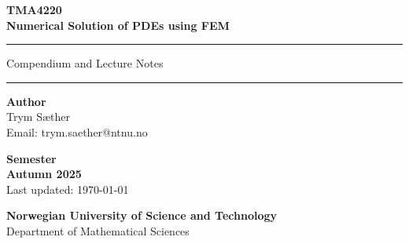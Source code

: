 

\begin{titlepage}
    \newcommand{\HRule}{\rule{\linewidth}{1pt}}
    \centering

    \vfill

    {\color{ntnu-blue}\sffamily\bfseries\LARGE TMA4220}\\[0.3cm]
    {\sffamily\bfseries\fontsize{28}{32}\selectfont Numerical Solution of PDEs using FEM}\\[0.5cm]

    \vfill

    {\color{ntnu-lightblue}\HRule}

    \vspace{0.6cm}

    {\color{ntnu-blue}\sffamily\huge Compendium and Lecture Notes}

    \vspace{0.4cm}

    {\color{ntnu-lightblue}\HRule}

    \vfill

    \begin{minipage}[tb]{0.45\textwidth}
        \raggedright
        {\color{ntnu-blue}\sffamily\large\textbf{Author}}\\[0.2cm]
        {\sffamily\large Trym Sæther}\\[0.2cm]

        {\sffamily\large Email: trym.saether@ntnu.no}\\[0.2cm]
    \end{minipage}
    \hfill
    \begin{minipage}[tb]{0.45\textwidth}
        \raggedleft
        {\color{ntnu-blue}\sffamily\large\textbf{Semester}}\\[0.2cm]
        {\bfseries\sffamily\large Autumn 2025}\\[0.2cm]
        {\sffamily\large Last updated: \today}
    \end{minipage}

    \vspace{1cm}
    {\color{ntnu-blue}\sffamily\bfseries\Large Norwegian University of Science and Technology}\\[0.2cm]
    {\sffamily\large Department of Mathematical Sciences}
\end{titlepage}
